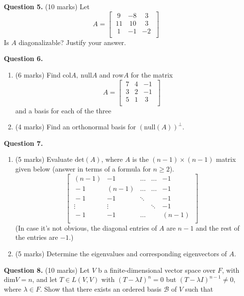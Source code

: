 \documentclass{article}
\begin{document}
\textbf{Question 5.} (10 marks) Let
$$A = \begin{bmatrix}
    \ \ 9 & -8 & \ \ 3 \ \\
    \ 11 & \ 10 & \ \ 3 \ \\
    \ \ 1 & -1 & -2 \ \\
\end{bmatrix}$$
Is $A$ diagonalizable? Justify your answer.

\newpage

\textbf{Question 6.}
\begin{enumerate}[label=(\alph*), leftmargin=6.25mm]
    \item (6 marks)
    Find $\text{col}A,\ \text{null}A$ and $\text{row}A$ for the matrix
    $$A = \begin{bmatrix}
        \ 7 & 4 & -1 \ \\
        \ 3 & 2 & -1 \ \\
        \ 5 & 1 & \ 3 \\
    \end{bmatrix}$$ and a basis for each of the three

    \item (4 marks) Find an orthonormal basis for $(\text{null}(A))^\perp$.
\end{enumerate}


\textbf{Question 7.}
\begin{enumerate}[label=(\alph*), leftmargin=6.25mm]
    \item (5 marks)
    Evaluate $\text{det}(A)$, where $A$ is the $(n-1) \times (n-1)$ matrix given below (answer in terms of a formula for $n \geq 2$).
    $$\begin{bmatrix}
        \ (n-1) & -1 & \ldots & \ldots & -1 \ \\
        \ -1 & (n-1) & \ldots & \ldots & -1 \ \\
        \ -1 & -1 & \ddots & & -1 \ \\
        \ \vdots & \vdots & & \ddots & -1 \ \\
        \ -1 & -1 & \ldots & & (n-1) \ \\
    \end{bmatrix}$$
    (In case it's not obvious, the diagonal entries of $A$ are $n-1$ and the rest of the entries are $-1$.)

    \item (5 marks)
    Determine the eigenvalues and corresponding eigenvectors of $A$.
\end{enumerate}


\textbf{Question 8.} (10 marks)
Let $V$ b a finite-dimensional vector space over $F$, with $\text{dim}V = n$, and let $T \in L(V, V)$ with $(T - \lambda I)^n = 0$
but $(T - \lambda I)^{n-1} \neq 0$, where $\lambda \in F$. Show that there exists an ordered basis $\mathcal{B}$ of $V$ such that
\end{document}
